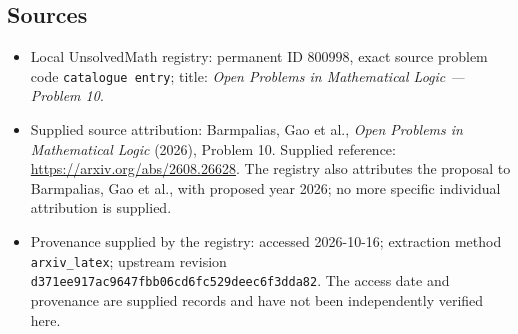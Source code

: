 \documentclass[11pt]{article}
\begin{document}
\subsection{Sources}
\begin{itemize}
\item Local UnsolvedMath registry: permanent ID \(800998\), exact source problem code \texttt{catalogue entry}; title: \emph{Open Problems in Mathematical Logic --- Problem 10}.
\item Supplied source attribution: Barmpalias, Gao et al., \emph{Open Problems in Mathematical Logic} (2026), Problem 10. Supplied reference: \url{https://arxiv.org/abs/2608.26628}. The registry also attributes the proposal to Barmpalias, Gao et al., with proposed year 2026; no more specific individual attribution is supplied.
\item Provenance supplied by the registry: accessed 2026-10-16; extraction method \texttt{arxiv\_latex}; upstream revision \texttt{d371ee917ac9647fbb06cd6fc529deec6f3dda82}. The access date and provenance are supplied records and have not been independently verified here.
\end{itemize}
\end{document}

